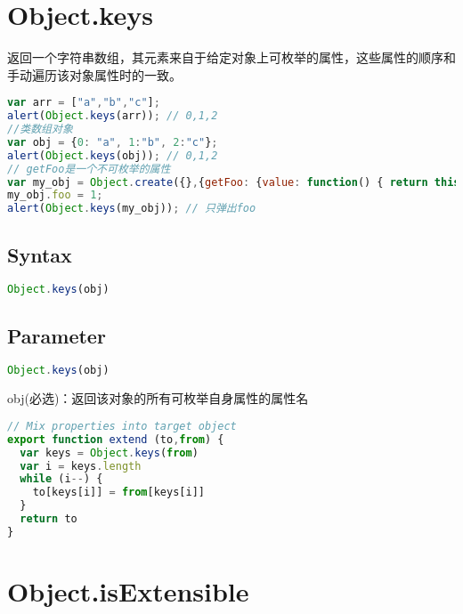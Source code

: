 \section{Object.keys}

返回一个字符串数组，其元素来自于给定对象上可枚举的属性，这些属性的顺序和手动遍历该对象属性时的一致。



\begin{lstlisting}[language=JavaScript]
var arr = ["a","b","c"];
alert(Object.keys(arr)); // 0,1,2
//类数组对象
var obj = {0: "a", 1:"b", 2:"c"};
alert(Object.keys(obj)); // 0,1,2
// getFoo是一个不可枚举的属性
var my_obj = Object.create({},{getFoo: {value: function() { return this.foo }}});
my_obj.foo = 1;
alert(Object.keys(my_obj)); // 只弹出foo
\end{lstlisting}

\subsection{Syntax}


\begin{lstlisting}[language=JavaScript]
Object.keys(obj)
\end{lstlisting}


\subsection{Parameter}




\begin{lstlisting}[language=JavaScript]
Object.keys(obj)
\end{lstlisting}


\begin{compactitem}
\item obj(必选)：返回该对象的所有可枚举自身属性的属性名
\end{compactitem}







\begin{lstlisting}[language=JavaScript]
// Mix properties into target object
export function extend (to,from) {
  var keys = Object.keys(from)
  var i = keys.length
  while (i--) {
    to[keys[i]] = from[keys[i]]
  }
  return to
}
\end{lstlisting}

\section{Object.isExtensible}

